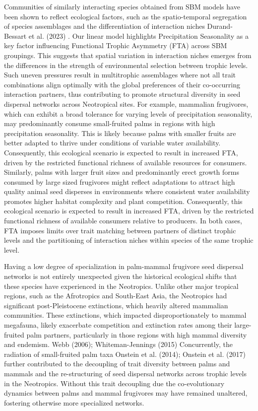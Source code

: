 \documentclass[
]{agujournal2019}
\begin{document}
Communities of similarly interacting species obtained from SBM models
have been shown to reflect ecological factors, such as the
spatio-temporal segregation of species assemblages and the
differentiation of interaction niches Durand-Bessart et al. (2023) . Our
linear model highlights Precipitation Seasonality as a key factor
influencing Functional Trophic Asymmetry (FTA) across SBM groupings.
This suggests that spatial variation in interaction niches emerges from
the differences in the strength of environmental selection between
trophic levels. Such uneven pressures result in multitrophic assemblages
where not all trait combinations align optimally with the global
preferences of their co-occurring interaction partners, thus
contributing to promote structural diversity in seed dispersal networks
across Neotropical sites. For example, mammalian frugivores, which can
exhibit a broad tolerance for varying levels of precipitation
seasonality, may predominantly consume small-fruited palms in regions
with high precipitation seasonality. This is likely because palms with
smaller fruits are better adapted to thrive under conditions of variable
water availability. Consequently, this ecological scenario is expected
to result in increased FTA, driven by the restricted functional richness
of available resources for consumers. Similarly, palms with larger fruit
sizes and predominantly erect growth forms consumed by large sized
frugivores might reflect adaptations to attract high quality animal seed
disperses in environments where consistent water availability promotes
higher habitat complexity and plant competition. Consequently, this
ecological scenario is expected to result in increased FTA, driven by
the restricted functional richness of available consumers relative to
producers. In both cases, FTA imposes limits over trait matching between
partners of distinct trophic levels and the partitioning of interaction
niches within species of the same trophic level.

Having a low degree of specialization in palm-mammal frugivore seed
dispersal networks is not entirely unexpected given the historical
ecological shifts that these species have experienced in the Neotropics.
Unlike other major tropical regions, such as the Afrotropics and
South-East Asia, the Neotropics had significant post-Pleistocene
extinctions, which heavily altered mammalian communities. These
extinctions, which impacted disproportionately to mammal megafauna,
likely exacerbate competition and extinction rates among their
large-fruited palm partners, particularly in those regions with high
mammal diversity and endemism. Webb (2006); Whiteman-Jennings (2015)
Concurrently, the radiation of small-fruited palm taxa Onstein et al.
(2014); Onstein et al. (2017) further contributed to the decoupling of
trait diversity between palms and mammals and the re-structuring of seed
dispersal networks across trophic levels in the Neotropics. Without this
trait decoupling due the co-evolutionary dynamics between palms and
mammal frugivores may have remained unaltered, fostering otherwise more
specialized networks.
\end{document}
